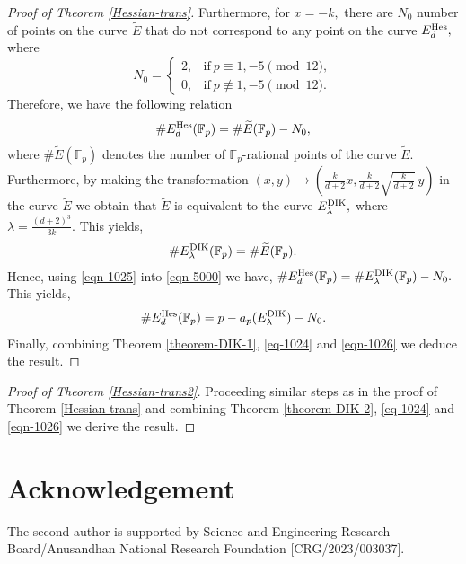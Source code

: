 \documentclass[12pt]{amsart}
\theoremstyle{plain}
\theoremstyle{definition}
\theoremstyle{remark}
\newcommand{\F}{\mathbb{F}}
\newcommand{\hes}{\text{{\rm{Hes}}}}
\newcommand{\dik}{\text{{\rm{DIK}}}}
\numberwithin{equation}{section}
\begin{document}
\begin{proof}[Proof of Theorem \ref{Hessian-trans}]
\noindent Furthermore, for $x=-k,$ there are $N_0$ number of points on the curve $\widetilde{E}$ that do not correspond to any point on the curve $E^{\hes}_d,$ where 
$$N_0=\begin{cases}
    2, & \text{if} \ p \equiv 1,-5 \pmod{12},\\0, &  \text{if}\ p\not\equiv 1,-5 \pmod{12}.
\end{cases}$$
\noindent Therefore, we have the following relation
\begin{align}\label{eqn-1025}
\#E^{\hes}_d(\F_p)=\#\widetilde{E}(\F_p)-N_0,
\end{align}
where $\#\widetilde{E}(\F_p)$ denotes the number of $\F_p$-rational points of the curve $\widetilde{E}.$
Furthermore, by making the transformation $(x,y)\rightarrow(\frac{k}{d+2}x, \frac{k}{d+2}\sqrt{\frac{k}{d+2}}\ y)$ in the curve $\widetilde{E}$ we obtain that $\widetilde{E}$ is equivalent to the curve $E^{\dik}_{\lambda},$ where $\lambda=\frac{(d+2)^3}{3k}.$ This yields,
\begin{align}\label{eqn-5000}
\# E^{\dik}_{\lambda}(\F_p)=\#\widetilde{E}(\F_p).
\end{align}
Hence, using \eqref{eqn-1025} into \eqref{eqn-5000} we have,
$\#E^{\hes}_d(\F_p)=\#{E^{\dik}_\lambda}(\F_p)-N_0.\notag
$
This yields, 
\begin{align}\label{eqn-1026}
 \#E^{\hes}_d(\F_p)=p-a_p(E^{\dik}_\lambda)-N_0.
 \end{align}
Finally, combining Theorem \ref{theorem-DIK-1}, \eqref{eq-1024} and \eqref{eqn-1026} we deduce the result.
\end{proof}

\begin{proof}[Proof of Theorem \ref{Hessian-trans2}]
Proceeding similar steps as in the proof of Theorem \ref{Hessian-trans} and 
combining Theorem \ref{theorem-DIK-2}, \eqref{eq-1024} and \eqref{eqn-1026} we derive the result.
\end{proof}
\section{Acknowledgement}
The second author is supported by Science and Engineering Research Board/Anusandhan National Research Foundation [CRG/2023/003037].
\end{document}
